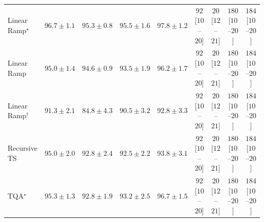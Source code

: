 \begin{tabular}{l|cccc|cccc|}
Linear Ramp$^\star$ & {\cellcolor[HTML]{034B76}} \color[HTML]{F1F1F1} $96.7\pm 1.1$ & {\cellcolor[HTML]{04598C}} \color[HTML]{F1F1F1} $95.3\pm 0.8$ & {\cellcolor[HTML]{045788}} \color[HTML]{F1F1F1} $95.5\pm 1.6$ & {\cellcolor[HTML]{034165}} \color[HTML]{F1F1F1} $97.8\pm 1.2$ & {\cellcolor[HTML]{F769A1}} \color[HTML]{F1F1F1} $92$ [$10$--$20$] & {\cellcolor[HTML]{FDE4E1}} \color[HTML]{000000} $20$ [$12$--$21$] & {\cellcolor[HTML]{51006C}} \color[HTML]{F1F1F1} $180$ [$10$--$20$] & {\cellcolor[HTML]{49006A}} \color[HTML]{F1F1F1} $184$ [$10$--$20$] \\
Linear Ramp & {\cellcolor[HTML]{045B8E}} \color[HTML]{F1F1F1} $95.0\pm 1.4$ & {\cellcolor[HTML]{045E93}} \color[HTML]{F1F1F1} $94.6\pm 0.9$ & {\cellcolor[HTML]{04649E}} \color[HTML]{F1F1F1} $93.5\pm 1.9$ & {\cellcolor[HTML]{034F7D}} \color[HTML]{F1F1F1} $96.2\pm 1.7$ & {\cellcolor[HTML]{F769A1}} \color[HTML]{F1F1F1} $92$ [$10$--$20$] & {\cellcolor[HTML]{FDE4E1}} \color[HTML]{000000} $20$ [$12$--$21$] & {\cellcolor[HTML]{51006C}} \color[HTML]{F1F1F1} $180$ [$10$--$20$] & {\cellcolor[HTML]{49006A}} \color[HTML]{F1F1F1} $184$ [$10$--$20$] \\
Linear Ramp$^\dagger$ & {\cellcolor[HTML]{0A73B2}} \color[HTML]{F1F1F1} $91.3\pm 2.1$ & {\cellcolor[HTML]{73A9CF}} \color[HTML]{F1F1F1} $84.8\pm 4.3$ & {\cellcolor[HTML]{167BB6}} \color[HTML]{F1F1F1} $90.5\pm 3.2$ & {\cellcolor[HTML]{0569A5}} \color[HTML]{F1F1F1} $92.8\pm 3.3$ & {\cellcolor[HTML]{F769A1}} \color[HTML]{F1F1F1} $92$ [$10$--$20$] & {\cellcolor[HTML]{FDE4E1}} \color[HTML]{000000} $20$ [$12$--$21$] & {\cellcolor[HTML]{51006C}} \color[HTML]{F1F1F1} $180$ [$10$--$20$] & {\cellcolor[HTML]{49006A}} \color[HTML]{F1F1F1} $184$ [$10$--$20$] \\
Recursive TS & {\cellcolor[HTML]{045B8E}} \color[HTML]{F1F1F1} $95.0\pm 2.0$ & {\cellcolor[HTML]{0569A5}} \color[HTML]{F1F1F1} $92.8\pm 2.4$ & {\cellcolor[HTML]{056BA7}} \color[HTML]{F1F1F1} $92.5\pm 2.2$ & {\cellcolor[HTML]{04629A}} \color[HTML]{F1F1F1} $93.8\pm 3.1$ & {\cellcolor[HTML]{F769A1}} \color[HTML]{F1F1F1} $92$ [$10$--$20$] & {\cellcolor[HTML]{FDE4E1}} \color[HTML]{000000} $20$ [$12$--$21$] & {\cellcolor[HTML]{51006C}} \color[HTML]{F1F1F1} $180$ [$10$--$20$] & {\cellcolor[HTML]{49006A}} \color[HTML]{F1F1F1} $184$ [$10$--$20$] \\
TQA$^\star$ & {\cellcolor[HTML]{04598C}} \color[HTML]{F1F1F1} $95.3\pm 1.3$ & {\cellcolor[HTML]{0569A5}} \color[HTML]{F1F1F1} $92.8\pm 1.9$ & {\cellcolor[HTML]{0567A1}} \color[HTML]{F1F1F1} $93.2\pm 2.5$ & {\cellcolor[HTML]{034B76}} \color[HTML]{F1F1F1} $96.7\pm 1.5$ & {\cellcolor[HTML]{F769A1}} \color[HTML]{F1F1F1} $92$ [$10$--$20$] & {\cellcolor[HTML]{FDE4E1}} \color[HTML]{000000} $20$ [$12$--$21$] & {\cellcolor[HTML]{51006C}} \color[HTML]{F1F1F1} $180$ [$10$--$20$] & {\cellcolor[HTML]{49006A}} \color[HTML]{F1F1F1} $184$ [$10$--$20$] \\

\end{tabular}

